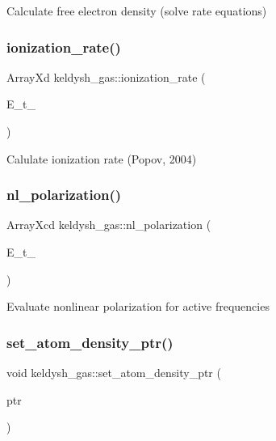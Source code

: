 Calculate free electron density (solve rate equations) \mbox{\label{classkeldysh__gas_a42dc79816adcae9c25499baa7256ec10}} 
\subsubsection{\texorpdfstring{ionization\+\_\+rate()}{ionization\_rate()}}
{\footnotesize\ttfamily Array\+Xd keldysh\+\_\+gas\+::ionization\+\_\+rate (\begin{DoxyParamCaption}\item[{Array\+Xd}]{E\+\_\+t\+\_\+ }\end{DoxyParamCaption})}

Calulate ionization rate (Popov, 2004) \mbox{\label{classkeldysh__gas_a1cd65d1983cb6c5ff9d04eeb29e94dd5}} 
\subsubsection{\texorpdfstring{nl\+\_\+polarization()}{nl\_polarization()}}
{\footnotesize\ttfamily Array\+Xcd keldysh\+\_\+gas\+::nl\+\_\+polarization (\begin{DoxyParamCaption}\item[{Array\+Xd}]{E\+\_\+t\+\_\+ }\end{DoxyParamCaption})}

Evaluate nonlinear polarization for active frequencies \mbox{\label{classkeldysh__gas_a051c59204ad55298d5632ac2eb4dd626}} 
\subsubsection{\texorpdfstring{set\+\_\+atom\+\_\+density\+\_\+ptr()}{set\_atom\_density\_ptr()}}
{\footnotesize\ttfamily void keldysh\+\_\+gas\+::set\+\_\+atom\+\_\+density\+\_\+ptr (\begin{DoxyParamCaption}\item[{\hyperlink{classkeldysh__gas_ab47ad59b466eee349a7500555869b988}{atom\+\_\+density\+\_\+func\+\_\+ptr}}]{ptr }\end{DoxyParamCaption})\hspace{0.3cm}{\ttfamily [private]}}



